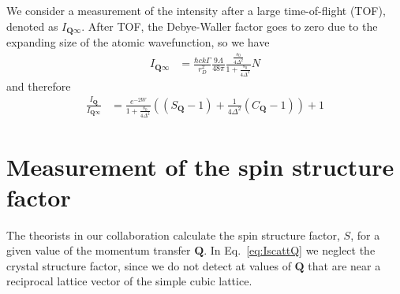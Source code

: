 \documentclass[11pt,letter]{article}
\newcommand{\bv}[1]{\ensuremath{\bm{#1}}}
\newcommand{\iisat}{\ensuremath{I_{\mathrm{p}}/I_{\mathrm{sat}}}}
\newcommand{\Iqtof}{\ensuremath{I_{\bv{Q}\infty} }}
\newcommand{\Iq}{\ensuremath{I_{\bv{Q}} }}
\begin{document}


We consider a measurement of the intensity after a large time-of-flight (TOF),
denoted as $\Iqtof$.  After TOF, the Debye-Waller factor goes to zero due to
the expanding size of the atomic wavefunction, so we have 
\begin{equation}
\begin{split} 
 \Iqtof
&  =
 \frac{\hbar c k \Gamma}{r_{D}^{2}}  
    \frac{9\Lambda}{48\pi}
    \frac{ \frac{ s_{0}}{ 4\Delta^{2}}}
           {1+\frac{ s_{0}}{ 4\Delta^{2}} } N 
\end{split}
\end{equation}
and therefore
\begin{equation}
\begin{split} 
 \frac{\Iq}{\Iqtof} 
&  =
    \frac{ e^{-2W}}
           {1+\frac{ s_{0}}{ 4\Delta^{2}} } 
   \left(  
     (S_{\bv{Q}}-1) + \frac{1}{4\Delta^{2}} (C_{\bv{Q}}-1) 
   \right) 
   + 1  
\end{split}
\label{eq:IscattQ}
\end{equation}




\section{Measurement of the spin structure factor} 

The theorists in our collaboration calculate the spin structure factor, $S$,
for a given value of the momentum transfer $\bv{Q}$.   In Eq.~\ref{eq:IscattQ}
we neglect the crystal structure factor, since we do not detect at values of
$\bv{Q}$ that are near a reciprocal lattice vector of the simple cubic lattice.
\end{document}
